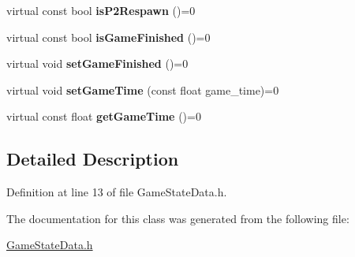 \begin{DoxyCompactItemize}
\item 
\hypertarget{class_game_state_data_af65fd6264b007c67e17ffa23e1b91cdb}{virtual const bool {\bfseries is\+P2\+Respawn} ()=0}\label{class_game_state_data_af65fd6264b007c67e17ffa23e1b91cdb}

\item 
\hypertarget{class_game_state_data_a96b7a0057780d2fac25569019804428e}{virtual const bool {\bfseries is\+Game\+Finished} ()=0}\label{class_game_state_data_a96b7a0057780d2fac25569019804428e}

\item 
\hypertarget{class_game_state_data_a304d37bb9b7844df62139139bd9cbb92}{virtual void {\bfseries set\+Game\+Finished} ()=0}\label{class_game_state_data_a304d37bb9b7844df62139139bd9cbb92}

\item 
\hypertarget{class_game_state_data_a1573842cc559d329f894add1678ffb03}{virtual void {\bfseries set\+Game\+Time} (const float game\+\_\+time)=0}\label{class_game_state_data_a1573842cc559d329f894add1678ffb03}

\item 
\hypertarget{class_game_state_data_a0cb5cf167da9dd1929c719778c5d3506}{virtual const float {\bfseries get\+Game\+Time} ()=0}\label{class_game_state_data_a0cb5cf167da9dd1929c719778c5d3506}

\end{DoxyCompactItemize}


\subsection{Detailed Description}


Definition at line 13 of file Game\+State\+Data.\+h.



The documentation for this class was generated from the following file\+:\begin{DoxyCompactItemize}
\item 
\hyperlink{_game_state_data_8h}{Game\+State\+Data.\+h}\end{DoxyCompactItemize}
